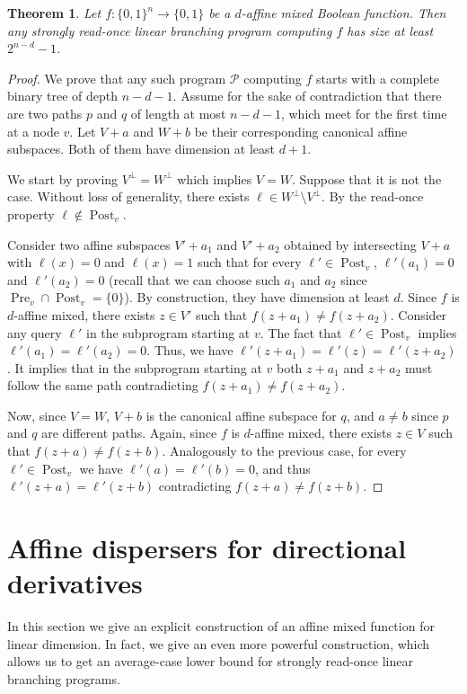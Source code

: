 \documentclass[10pt,a4paper]{article}
\newtheorem{theorem}{Theorem}
\theoremstyle{definition}
\theoremstyle{remark}
\DeclareMathOperator{\pre}{Pre}
\DeclareMathOperator{\post}{Post}
\newcommand{\orth}[1]{{#1}^{\perp}}
\newcommand{\Q}{{\{0,1\}}}
\newcommand{\calP}{\mathcal{P}}
\newcommand{\sreadonce}{strongly read-once}
\newcommand{\readonce}{read-once}
\begin{document}
\begin{theorem}
  Let $f\colon \Q^n \to \Q$ be a $d$-affine mixed Boolean function. Then any \sreadonce{} linear branching program computing $f$ has size at least $2^{n-d}-1$.
\end{theorem}
\begin{proof}
  We prove that any such program $\calP$ computing $f$ starts with a complete binary tree of depth $n-d-1$. Assume for the sake of contradiction that there are two paths $p$ and $q$ of length at most $n-d-1$, which meet for the first time at a node $v$. Let $V+a$ and $W+b$ be their corresponding canonical affine subspaces. Both of them have dimension at least $d+1$.

  We start by proving $\orth{V} = \orth{W}$ which implies $V = W$. Suppose that it is not the case. Without loss of generality, there exists $\ell \in \orth{W} \setminus \orth{V}$. By the \readonce{} property $\ell \not\in \post_v$.

  Consider two affine subspaces $V'+a_1$ and $V'+a_2$ obtained by intersecting $V+a$ with $\ell(x) = 0$ and $\ell(x)=1$ such that for every $\ell' \in \post_v$, $\ell'(a_1) = 0$ and $\ell'(a_2) = 0$ (recall that we can choose such $a_1$ and $a_2$ since $\pre_v \cap \post_v = \{0\}$). By construction, they have dimension at least $d$.
  Since $f$ is $d$-affine mixed, there exists $z \in V'$ such that $f(z+a_1) \neq f(z+a_2)$.
  Consider any query $\ell'$ in the subprogram starting at $v$. The fact that $\ell' \in \post_v$ implies $\ell'(a_1) = \ell'(a_2) = 0$. Thus, we have $\ell'(z+a_1) = \ell'(z) = \ell'(z+a_2)$. It implies that in the subprogram starting at $v$ both $z+a_1$ and $z+a_2$ must follow the same path contradicting $f(z+a_1) \neq f(z+a_2)$.

  Now, since $V = W$, $V+b$ is the canonical affine subspace for $q$, and $a \ne b$ since $p$ and $q$ are different paths.
  Again, since $f$ is $d$-affine mixed, there exists $z \in V$ such that $f(z+a) \neq f(z+b)$. Analogously to the previous case, for every $\ell' \in \post_v$ we have $\ell'(a)=\ell'(b)=0$, and thus $\ell'(z+a) = \ell'(z+b)$ contradicting $f(z+a) \neq f(z+b)$.
\end{proof}

\section{Affine dispersers for directional derivatives}

In this section we give an explicit construction of an affine mixed function for linear dimension. In fact, we give an even more powerful construction, which allows us to get an average-case lower bound for \sreadonce{} linear branching programs.
\end{document}
